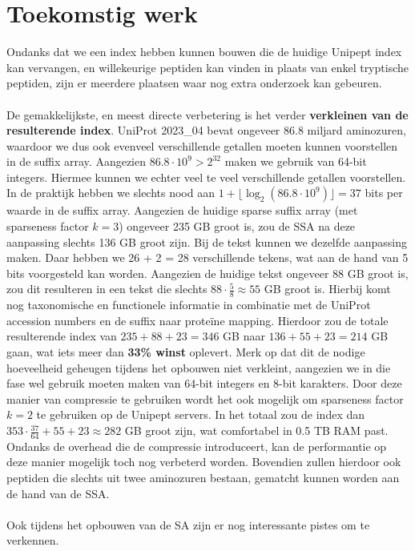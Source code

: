 \section{Toekomstig werk}
Ondanks dat we een index hebben kunnen bouwen die de huidige Unipept index kan vervangen, en willekeurige peptiden kan vinden in plaats van enkel tryptische peptiden, zijn er meerdere plaatsen waar nog extra onderzoek kan gebeuren.
\\ \\
De gemakkelijkste, en meest directe verbetering is het verder \textbf{verkleinen van de resulterende index}.
UniProt 2023\_04 bevat ongeveer 86.8 miljard aminozuren, waardoor we dus ook evenveel verschillende getallen moeten kunnen voorstellen in de suffix array.
Aangezien $86.8 \cdot 10^9 > 2^{32}$ maken we gebruik van 64-bit integers.
Hiermee kunnen we echter veel te veel verschillende getallen voorstellen.
In de praktijk hebben we slechts nood aan $1 + \lfloor \log_2(86.8 \cdot 10^9) \rfloor = 37$ bits per waarde in de suffix array.
Aangezien de huidige sparse suffix array (met sparseness factor $k = 3$) ongeveer 235 GB groot is, zou de SSA na deze aanpassing slechts 136 GB groot zijn.
Bij de tekst kunnen we dezelfde aanpassing maken.
Daar hebben we 26 + 2 = 28 verschillende tekens, wat aan de hand van 5 bits voorgesteld kan worden.
Aangezien de huidige tekst ongeveer 88 GB groot is, zou dit resulteren in een tekst die slechts $88 \cdot \frac{5}{8} \approx 55$ GB groot is.
Hierbij komt nog taxonomische en functionele informatie in combinatie met de UniProt accession numbers en de suffix naar proteïne mapping.
Hierdoor zou de totale resulterende index van $235 + 88 + 23 = 346$ GB naar $136 + 55 + 23 = 214$ GB gaan, wat iets meer dan \textbf{33\% winst} oplevert.
Merk op dat dit de nodige hoeveelheid geheugen tijdens het opbouwen niet verkleint, aangezien we in die fase wel gebruik moeten maken van 64-bit integers en 8-bit karakters.
Door deze manier van compressie te gebruiken wordt het ook mogelijk om sparseness factor $k = 2$ te gebruiken op de Unipept servers.
In het totaal zou de index dan $353 \cdot \frac{37}{64} + 55 + 23 \approx 282$ GB groot zijn, wat comfortabel in 0.5 TB RAM past.
Ondanks de overhead die de compressie introduceert, kan de performantie op deze manier mogelijk toch nog verbeterd worden.
Bovendien zullen hierdoor ook peptiden die slechts uit twee aminozuren bestaan, gematcht kunnen worden aan de hand van de SSA\@.
\\ \\
Ook tijdens het opbouwen van de SA zijn er nog interessante pistes om te verkennen.
